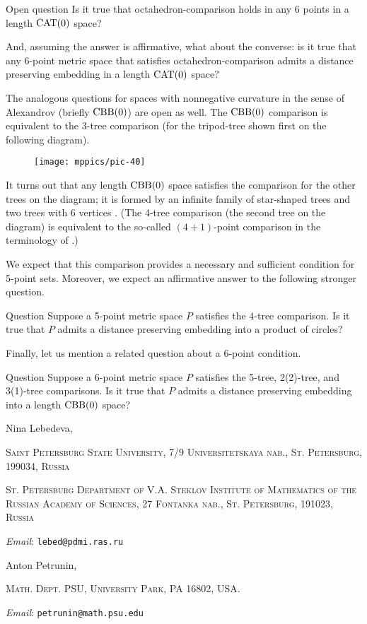 \documentclass{article}
\makeatletter
\newcommand{\Addresses}{{\bigskip\footnotesize

\noindent Nina Lebedeva,
\par\nopagebreak
 \textsc{Saint Petersburg State University, 7/9 Universitetskaya nab., St. Petersburg, 199034, Russia}
\par
\nopagebreak
 \textsc{St. Petersburg Department of V.A. Steklov Institute of Mathematics of the Russian Academy of Sciences, 27 Fontanka nab., St. Petersburg, 191023, Russia}
  \par\nopagebreak
  \textit{Email}: \texttt{lebed@pdmi.ras.ru}

\medskip

\noindent   Anton Petrunin, 
\par\nopagebreak
 \textsc{Math. Dept. PSU, University Park, PA 16802, USA.}
  \par\nopagebreak
  \textit{Email}: \texttt{petrunin@math.psu.edu}
  
}}
\makeatother
\begin{document}
\begin{thm}{Open question}
Is it true that octahedron-comparison holds in any 6 points in a length $\mathrm{CAT}(0)$ space?

And, assuming the answer is affirmative, what about the converse: is it true that any 6-point metric space that satisfies octahedron-comparison admits a distance preserving embedding in a length $\mathrm{CAT}(0)$ space?
\end{thm}


The analogous questions for  spaces with nonnegative curvature in the sense of Alexandrov (briefly $\mathrm{CBB}(0)$) are open as well.
The $\mathrm{CBB}(0)$ comparison is equivalent to the $3$-tree comparison (for the tripod-tree shown first on the following diagram).
\begin{figure}[h!]
\vskip-0mm
\centering
\texttt{[image: mppics/pic-40]}
\end{figure}
It turns out that any length $\mathrm{CBB}(0)$ space satisfies the comparison for the other trees on the diagram; it is formed by an infinite family of star-shaped trees and two trees with 6 vertices \cite{alexander-kapovitch-petrunin-2011,lebedeva-petrunin-zolotov}.
(The 4-tree comparison (the second tree on the diagram) is equivalent to the so-called $(4{+}1)$-point comparison in the terminology of \cite{alexander-kapovitch-petrunin-2011}.)

We expect that this comparison provides a necessary and sufficient condition for 5-point sets. Moreover, we expect an affirmative answer to the following stronger question.


\begin{thm}{Question}
Suppose a 5-point metric space $P$ satisfies the $4$-tree comparison.
Is it true that $P$ admits a distance preserving embedding into a product of circles?
\end{thm}

Finally, let us mention a related question about a 6-point condition. 

\begin{thm}{Question}
Suppose a 6-point metric space $P$ satisfies the 5-tree, 2(2)-tree, and 3(1)-tree comparisons.
Is it true that $P$ admits a distance preserving embedding into a length $\mathrm{CBB}(0)$ space?
\end{thm}

{\sloppy
\printbibliography[heading=bibintoc]
\fussy
}

\Addresses
\end{document}
